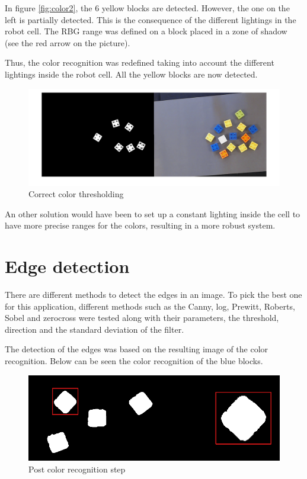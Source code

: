 In figure \ref{fig:color2}, the 6 yellow blocks are detected. However, the one on the left is partially detected. This is the consequence of the different lightings in the robot cell. The RBG range was defined on a block placed in a zone of shadow (see the red arrow on the picture). \par


Thus, the color recognition was redefined taking into account the different lightings inside the robot cell. All the yellow blocks are now detected.



\begin{figure}[H]
  \centering
  \includegraphics[scale=0.3]{figures/Thres_Y_good.png}
  \caption[LABEL] {Correct color thresholding}
\end{figure}

An other solution would have been to set up a constant lighting inside the cell to have more precise ranges for the colors, resulting in a more robust system.



 \section{Edge detection}

	There are different methods to detect the edges in an image. To pick the best one for this application, different methods such as the Canny, log, Prewitt, Roberts, Sobel and zerocross were tested along with their parameters, the threshold, direction and the standard deviation of the filter. \par


	The detection of the edges was based on the resulting image of the color recognition. Below can be seen the color recognition of the blue blocks.

	\begin{figure}[H]
  \centering
  \includegraphics[scale=0.3]{figures/color_rec_zoom.png}
  \caption[LABEL] {Post color recognition step}
\end{figure}	
	


